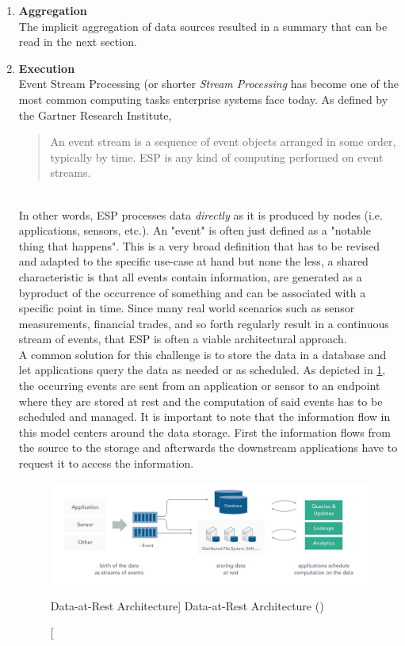 \begin{enumerate}
    \item
    \textbf{Aggregation}\\
    The implicit aggregation of data sources resulted in a summary that can be read in the next section.
    
    \item
    \textbf{Execution}\\
    Event Stream Processing (or shorter \textit{Stream Processing} has become one of the most common computing tasks enterprise systems face today. As defined by the Gartner Research Institute,
    \blockquote{An event stream is a sequence of event objects arranged in some order, typically by time. \acf{ESP} is any kind of computing performed on event streams.}\autocite{Schulte2017TechnologyProcessing}\\
    In other words, \acf{ESP} processes data \textit{directly} as it is produced by nodes (i.e. applications, sensors, etc.). An "event" is often just defined as a "notable thing that happens".\autocite{Group2006Event-DrivenOverview} This is a very broad definition that has to be revised and adapted to the specific use-case at hand but none the less, a shared characteristic is that all events contain information, are generated as a byproduct of the occurrence of something and can be associated with a specific point in time. 
    Since many real world scenarios such as sensor measurements, financial trades, and so forth regularly result in a continuous stream of events, that \acf{ESP} is often a viable architectural approach.\\
    A common solution for this challenge is to store the data in a database and let applications query the data as needed or as scheduled. As depicted in \ref{fig:dataRest}, the occurring events are sent from an application or sensor to an endpoint where they are stored at rest and the computation of said events has to be scheduled and managed. It is important to note that the information flow in this model centers around the data storage. First the information flows from the source to the storage and afterwards the downstream applications have to request it to access the information.
    
    \begin{figure}[ht]
        \includegraphics[width=\linewidth]{images/streaming/data_at_rest.png}\centering
        \caption
        [Data-at-Rest Architecture]
        {Data-at-Rest Architecture (\cite{dataArtisans2017WhatProcessing})}
        \label{fig:dataRest}
    \end{figure}
    

\end{enumerate}
